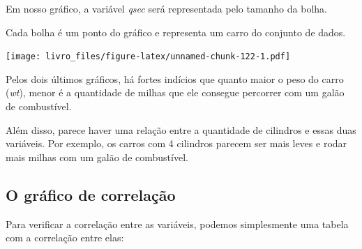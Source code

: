 \documentclass[
]{book}
\newenvironment{Shaded}{\begin{snugshade}}{\end{snugshade}}
\newcommand{\CommentTok}[1]{\textcolor[rgb]{0.56,0.35,0.01}{\textit{#1}}}
\newcommand{\DataTypeTok}[1]{\textcolor[rgb]{0.13,0.29,0.53}{#1}}
\newcommand{\DecValTok}[1]{\textcolor[rgb]{0.00,0.00,0.81}{#1}}
\newcommand{\FloatTok}[1]{\textcolor[rgb]{0.00,0.00,0.81}{#1}}
\newcommand{\KeywordTok}[1]{\textcolor[rgb]{0.13,0.29,0.53}{\textbf{#1}}}
\newcommand{\NormalTok}[1]{#1}
\newcommand{\OperatorTok}[1]{\textcolor[rgb]{0.81,0.36,0.00}{\textbf{#1}}}
\newcommand{\StringTok}[1]{\textcolor[rgb]{0.31,0.60,0.02}{#1}}
\begin{document}
Em nosso gráfico, a variável \emph{qsec} será representada pelo tamanho
da bolha.

Cada bolha é um ponto do gráfico e representa um carro do conjunto de
dados.

\begin{Shaded}
\end{Shaded}

\texttt{[image: livro\_files/figure-latex/unnamed-chunk-122-1.pdf]}

Pelos dois últimos gráficos, há fortes indícios que quanto maior o peso
do carro (\emph{wt}), menor é a quantidade de milhas que ele consegue
percorrer com um galão de combustível.

Além disso, parece haver uma relação entre a quantidade de cilindros e
essas duas variáveis. Por exemplo, os carros com 4 cilindros parecem ser
mais leves e rodar mais milhas com um galão de combustível.

\hypertarget{o-gruxe1fico-de-correlauxe7uxe3o}{%
\subsection{O gráfico de
correlação}\label{o-gruxe1fico-de-correlauxe7uxe3o}}

Para verificar a correlação entre as variáveis, podemos simplesmente uma
tabela com a correlação entre elas:
\end{document}

